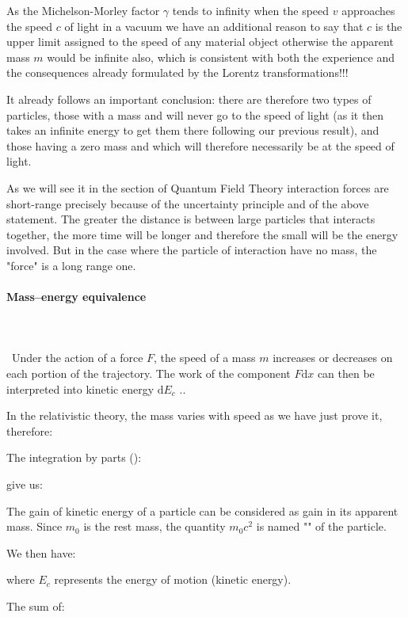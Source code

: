 	As the Michelson-Morley factor $\gamma$ tends to infinity when the speed $v$ approaches the speed $c$ of light in a vacuum we have an additional reason to say that $c$ is the upper limit assigned to the speed of any material object otherwise the apparent mass $m$ would be infinite also, which is consistent with both the experience and the consequences already formulated by the Lorentz transformations!!!
	
	It already follows an important conclusion: there are therefore two types of particles, those with a mass and will never go to the speed of light (as it then takes an infinite energy to get them there following our previous result), and those having a zero mass and which will therefore necessarily be at the speed of light.
	
	As we will see it in the section of Quantum Field Theory interaction forces are short-range precisely because of the uncertainty principle and of the above statement. The greater the distance is between large particles that interacts together, the more time will be longer and therefore the small will be the energy involved. But in the case where the particle of interaction have no mass, the "force" is a long range one.
	
	\pagebreak
	\paragraph{Mass–energy equivalence}\mbox{}\\\\\
	Under the action of a force $F$, the speed of a mass $m$ increases or decreases on each portion of the trajectory. The work of the component $F\mathrm{d}x$  can then be interpreted into kinetic energy $\mathrm{d}E_c$ ..

	In the relativistic theory, the mass varies with speed as we have just prove it, therefore:
	
	The integration by parts ():
	
	give us:
	
	The gain of kinetic energy of a particle can be considered as gain in its apparent mass. Since $m_0$ is the rest mass, the quantity $m_0c^2$ is named "" of the particle.

	We then have:
	
	where $E_c$ represents the energy of motion (kinetic energy).

	The sum of:
	
